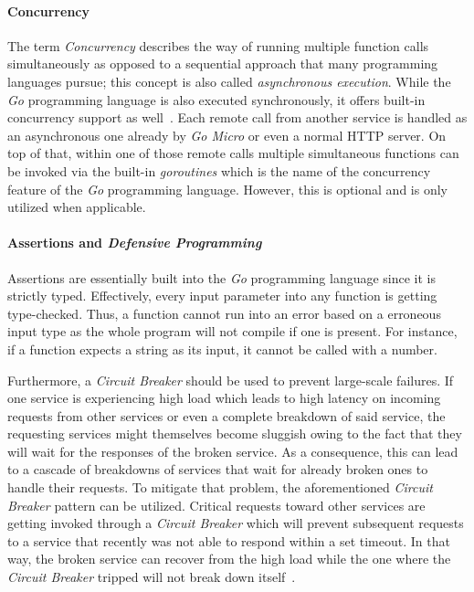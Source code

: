 \documentclass[12pt,a4paper,twoside]{report}
\begin{document}
\paragraph{Concurrency}
The term \textit{Concurrency} describes the way of running multiple function
calls simultaneously as opposed to a sequential approach that many programming languages
pursue; this concept is also called \textit{asynchronous execution}.
While the \textit{Go} programming language is also executed synchronously,
it offers built-in concurrency support as well~\cite{golang-concurrency}.
Each remote call from another service is handled as an asynchronous one already
by \textit{Go Micro} or even a normal HTTP server. On top of that, within one
of those remote calls multiple simultaneous functions can be invoked via
the built-in \textit{goroutines} which is the name of the concurrency feature
of the \textit{Go} programming language. However, this is optional and is only
utilized when applicable.

\paragraph{Assertions and \textit{Defensive Programming}}
Assertions are essentially built into the \textit{Go} programming language
since it is strictly typed. Effectively, every input parameter into any
function is getting type-checked. Thus, a function cannot run into an error
based on a erroneous input type as the whole program will not compile
if one is present. For instance, if a function expects a string as its input,
it cannot be called with a number.

Furthermore, a \textit{Circuit Breaker} should be used to prevent large-scale failures.
If one service is experiencing high load which leads to high latency on incoming
requests from other services or even a complete breakdown of said service,
the requesting services might themselves become sluggish owing to the fact
that they will wait for the responses of the broken service.
As a consequence, this can lead to a cascade of breakdowns of services that wait for
already broken ones to handle their requests. To mitigate that problem,
the aforementioned \textit{Circuit Breaker} pattern can be utilized.
Critical requests toward other services are getting invoked through
a \textit{Circuit Breaker} which will prevent subsequent requests to
a service that recently was not able to respond within a set timeout.
In that way, the broken service can recover from the high load
while the one where the \textit{Circuit Breaker} tripped will not
break down itself~\cite{fowler-circuit-breaker}.
\end{document}
